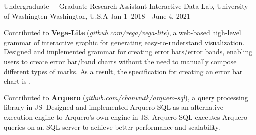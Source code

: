 \begin{cventries}
  \cvwork
    {Undergraduate + Graduate Research Assistant} %
    {Interactive Data Lab, University of Washington} %
    {Washington, U.S.A} %
    {Jan 1, 2018 - June 4, 2021} %
    {
      \begin{cvitems} %
        \item {
          Contributed to \textbf{Vega-Lite} (\href{https://www.github.com/vega/vega-lite}{\textit{github.com/vega/vega-lite}}), a \underline{web-based} high-level grammar of interactive graphic for generating easy-to-understand visualization.
          Designed and implemented grammar for creating error bars/error bands,
          enabling users to create error bar/band charts without the need to manually compose different types of marks.
          As a result, the specification for creating an error bar chart is \underline{}.
        }
        \item {
          Contributed to \textbf{Arquero} (\href{https://www.github.com/chanwutk/arquero-sql}{\textit{github.com/chanwutk/arquero-sql}}), a query processing library in JS.
          Designed and implemented Arquero-SQL as an alternative execution engine to Arquero's own engine in JS.
          Arquero-SQL executes Arquero queries on an SQL server to achieve better performance and scalability.
        }
      \end{cvitems}
    }



\end{cventries}
